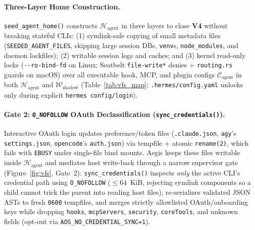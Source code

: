 \documentclass[10pt,twocolumn]{article}
\begin{document}
\paragraph{Three-Layer Home Construction.}
\texttt{seed\_agent\_home()} constructs $\mathcal{H}_{\text{agent}}$ in three layers to close \textbf{V4} without breaking stateful CLIs: (1) symlink-safe copying of small metadata files (\texttt{SEEDED\_AGENT\_FILES}, skipping large session DBs, \texttt{venv}s, \texttt{node\_modules}, and daemon lockfiles); (2) writable session logs and caches; and (3) kernel read-only locks (\texttt{-\/-ro-bind-fd} on Linux; Seatbelt \texttt{file-write*} denies + \texttt{routing.rs} guards on macOS) over all executable hook, MCP, and plugin configs $\mathcal{C}_{\text{agent}}$ in both $\mathcal{H}_{\text{agent}}$ and $\mathcal{W}_{\text{shadow}}$ (Table~\ref{tab:vfs_map}; \texttt{.hermes/config.yaml} unlocks only during explicit \texttt{hermes config/login}).

\paragraph{Gate 2: \texttt{O\_NOFOLLOW} OAuth Declassification (\texttt{sync\_credentials()}).}
Interactive OAuth login updates preference/token files (\texttt{.claude.json}, \texttt{agy}'s \texttt{settings.json}, \texttt{opencode}'s \texttt{auth.json}) via tempfile + atomic \texttt{rename(2)}, which fails with \texttt{EBUSY} under single-file bind mounts. Aegis keeps these files writable inside $\mathcal{H}_{\text{agent}}$ and mediates host write-back through a narrow supervisor gate (Figure~\ref{fig:vfs}, Gate~2): \texttt{sync\_credentials()} inspects \emph{only} the active CLI's credential path using \texttt{O\_NOFOLLOW} ($\le 64$~KiB, rejecting symlink components so a child cannot trick the parent into reading host files), re-serializes validated JSON ASTs to fresh \texttt{0600} tempfiles, and merges strictly allowlisted OAuth/onboarding keys while dropping \texttt{hooks}, \texttt{mcpServers}, \texttt{security}, \texttt{coreTools}, and unknown fields (opt-out via \texttt{AOS\_NO\_CREDENTIAL\_SYNC=1}).
\end{document}
